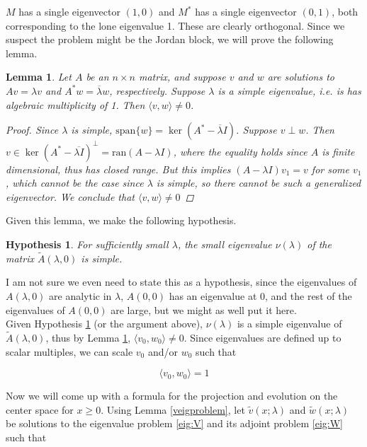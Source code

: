 \documentclass[12pt]{article}
\newtheorem{lemma}{Lemma}
\newtheorem{hypothesis}{Hypothesis}
\begin{document}
$M$ has a single eigenvector $(1, 0)$ and $M^*$ has a single eigenvector $(0, 1)$, both corresponding to the lone eigenvalue 1. These are clearly orthogonal. Since we suspect the problem might be the Jordan block, we will prove the following lemma.

\begin{lemma}\label{perpeigs}
Let $A$ be an $n \times n$ matrix, and suppose $v$ and $w$ are solutions to $Av = \lambda v$ and $A^*w = \overline{\lambda}w$, respectively. Suppose $\lambda$ is a simple eigenvalue, i.e. is has algebraic multiplicity of 1. Then $\langle v, w \rangle \neq 0$.
\begin{proof}
Since $\lambda$ is simple, $\text{span} \{w\} = \ker(A^* - \overline{\lambda}I)$. Suppose $v \perp w$. Then $v \in \ker(A^* - \overline{\lambda I})^\perp = \text{ran}(A - \lambda I)$, where the equality holds since $A$ is finite dimensional, thus has closed range. But this implies $(A - \lambda I)v_1 = v$ for some $v_1$, which cannot be the case since $\lambda$ is simple, so there cannot be such a generalized eigenvector. We conclude that $\langle v, w \rangle \neq 0$
\end{proof}
\end{lemma}

Given this lemma, we make the following hypothesis.

\begin{hypothesis}\label{simplesmalleig}
For sufficiently small $\lambda$, the small eigenvalue $\nu(\lambda)$ of the matrix $\tilde{A}(\lambda, 0)$ is simple.
\end{hypothesis}

I am not sure we even need to state this as a hypothesis, since the eigenvalues of $A(\lambda, 0)$ are analytic in $\lambda$, $A(0, 0)$ has an eigenvalue at 0, and the rest of the eigenvalues of $A(0, 0)$ are large, but we might as well put it here.\\

Given Hypothesis \ref{simplesmalleig} (or the argument above), $\nu(\lambda)$ is a simple eigenvalue of $\tilde{A}(\lambda, 0)$, thus by Lemma \ref{perpeigs}, $\langle v_0, w_0 \rangle \neq 0$. Since eigenvalues are defined up to scalar multiples, we can scale $v_0$ and/or $w_0$ such that

\[
\langle v_0, w_0 \rangle = 1
\]
 
Now we will come up with a formula for the projection and evolution on the center space for $x \geq 0$. Using Lemma \ref{veigproblem}, let $\tilde{v}(x; \lambda)$ and $\tilde{w}(x; \lambda)$ be solutions to the eigenvalue problem \eqref{eig:V} and its adjoint problem \eqref{eig:W} such that
\end{document}

